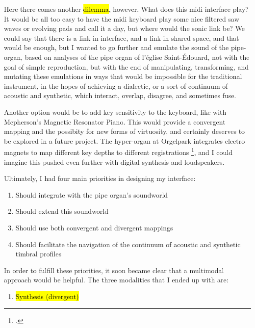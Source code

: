 \documentclass[12pt,twoside,maitrise]{dms_ks}
\theoremstyle{definition}
\begin{document}
{{Here there comes another \hl{dilemma}, however.
What does this midi interface play?
It would be all too easy to have the midi keyboard play some nice filtered saw waves or evolving pads and call it a day, but where would the sonic link be?
We could say that there is a link in interface, and a link in shared space, and that would be enough, but I wanted to go further and emulate the sound of the pipe-organ, based on analyses of the pipe organ of l'église Saint-Édouard, not with the goal of simple reproduction, but with the end of manipulating, transforming, and mutating these emulations in ways that would be impossible for the traditional instrument, in the hopes of achieving a dialectic, or a sort of continuum of acoustic and synthetic, which interact, overlap, disagree, and sometimes fuse.


Another option would be to add key sensitivity to the keyboard, like with Mcpherson's Magnetic Resonator Piano. This would provide a convergent mapping and the possibity for new forms of virtuosity, and certainly deserves to be explored in a future project. The hyper-organ at Orgelpark integrates electro magnets to map different key depths to different registrations \footcite[14]{van_heumen_new_2014}, and I could imagine this pushed even further with digital synthesis and loudspeakers. 

Ultimately, I had four main priorities in designing my interface:

\begin{enumerate}
  \item Should integrate with the pipe organ's soundworld

  \item Should extend this soundworld
   
  \item Should use both convergent and divergent mappings

  \item Should facilitate the navigation of the continuum of acoustic
and synthetic timbral profiles
\end{enumerate}

In order to fulfill these priorities, it soon became clear that a multimodal approach would be helpful. The three modalities that I ended up with are:

\begin{enumerate}
  \item \hl{Synthesis (divergent)}
  

\end{enumerate}}}
\end{document}
